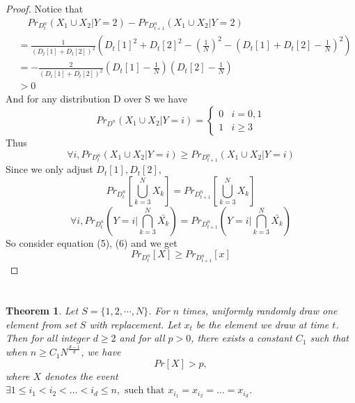 \documentclass{article}
\newtheorem{theorem}{Theorem}
\begin{document}
\begin{spacing}{1.1}
\begin{proof}
        Notice that
        \begin{equation}
            \begin{aligned}
                &\quad Pr_{D_t^n}(X_1\cup X_2 | Y = 2) - Pr_{D_{t+1}^n}(X_1\cup X_2 | Y = 2)\\
                &= \frac{1}{(D_t[1] + D_t[2])^2}(D_t[1]^2 + D_t[2]^2 - (\frac{1}{N})^2 - (D_t[1] + D_t[2] - \frac{1}{N})^2)\\
                &= -\frac{2}{(D_t[1] + D_t[2])^2}(D_t[1] - \frac{1}{N})(D_t[2] - \frac{1}{N})\\
                &> 0
            \end{aligned}
        \end{equation}
        And for any distribution D over S we have
        \begin{equation}
            Pr_{D^n}(X_1\cup X_2 | Y = i) =
            \begin{cases}
                0 & i = 0, 1\\
                1 & i \geq 3
            \end{cases}
        \end{equation}
        Thus
        $$\forall i, Pr_{D_t^n}(X_1\cup X_2 | Y = i) \geq Pr_{D_{t+1}^n}(X_1\cup X_2 | Y = i)$$
        Since we only adjust $D_t[1], D_t[2]$,
        $$Pr_{D_t^n}[\bigcup_{k = 3}^N X_k] = Pr_{D_{t+1}^n}[\bigcup_{k = 3}^N X_k]$$
        $$\forall i, Pr_{D_t^n}(Y = i | \bigcap_{k = 3}^N \bar{X_k}) = Pr_{D_{t+1}^n}(Y = i | \bigcap_{k = 3}^N \bar{X_k})$$
        So consider equation (5), (6) and we get
        $$Pr_{D_t^n}[X] \geq Pr_{D_{t+1}^n}[x]$$
    \end{proof}
    
    \section{}

    \subsection{}

    \begin{theorem}

    Let $S = \{1, 2, \cdots, N\}$. For $n$ times, uniformly randomly draw one element from set $S$ with replacement. Let $x_t$ be the element we draw at time $t$. Then for all integer $d\geq 2$ and for all $p > 0$, there exists a constant $C_1$ such that when $n \geq C_1 {N}^{\frac{d-1}{d}}$, we have
    $$Pr[X] > p,$$
    where $X$ denotes the event $\exists 1\leq i_1< i_2<\dots<i_d \leq n, \text{ such that } x_{i_1} = x_{i_2}=\dots=x_{i_d}$.


\end{theorem}
\end{spacing}
\end{document}
